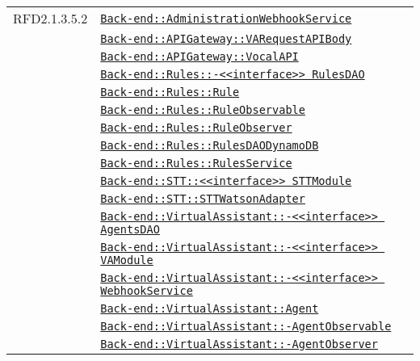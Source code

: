 \begin{longtable}{|>{\centering}m{3cm}|m{10cm}<{\centering}|}
RFD2.1.3.5.2 & \hyperref[Back-end::AdministrationWebhookService]{\texttt{Back-end::AdministrationWebhookService}}\\
& \hyperref[Back-end::APIGateway::VARequestAPIBody]{\texttt{Back-end::APIGateway::VARequestAPIBody}}\\
& \hyperref[Back-end::APIGateway::VocalAPI]{\texttt{Back-end::APIGateway::VocalAPI}}\\
& \hyperref[Back-end::Rules::<<interface>> RulesDAO]{\texttt{Back-end::Rules::-\linebreak <<interface>> RulesDAO}}\\
& \hyperref[Back-end::Rules::Rule]{\texttt{Back-end::Rules::Rule}}\\
& \hyperref[Back-end::Rules::RuleObservable]{\texttt{Back-end::Rules::RuleObservable}}\\
& \hyperref[Back-end::Rules::RuleObserver]{\texttt{Back-end::Rules::RuleObserver}}\\
& \hyperref[Back-end::Rules::RulesDAODynamoDB]{\texttt{Back-end::Rules::RulesDAODynamoDB}}\\
& \hyperref[Back-end::Rules::RulesService]{\texttt{Back-end::Rules::RulesService}}\\
& \hyperref[Back-end::STT::<<interface>> STTModule]{\texttt{Back-end::STT::<<interface>> STTModule}}\\
& \hyperref[Back-end::STT::STTWatsonAdapter]{\texttt{Back-end::STT::STTWatsonAdapter}}\\
& \hyperref[Back-end::VirtualAssistant::<<interface>> AgentsDAO]{\texttt{Back-end::VirtualAssistant::-\linebreak <<interface>> AgentsDAO}}\\
& \hyperref[Back-end::VirtualAssistant::<<interface>> VAModule]{\texttt{Back-end::VirtualAssistant::-\linebreak <<interface>> VAModule}}\\
& \hyperref[Back-end::VirtualAssistant::<<interface>> WebhookService]{\texttt{Back-end::VirtualAssistant::-\linebreak <<interface>> WebhookService}}\\
& \hyperref[Back-end::VirtualAssistant::Agent]{\texttt{Back-end::VirtualAssistant::Agent}}\\
& \hyperref[Back-end::VirtualAssistant::AgentObservable]{\texttt{Back-end::VirtualAssistant::-\linebreak AgentObservable}}\\
& \hyperref[Back-end::VirtualAssistant::AgentObserver]{\texttt{Back-end::VirtualAssistant::-\linebreak AgentObserver}}\\

\end{longtable}
